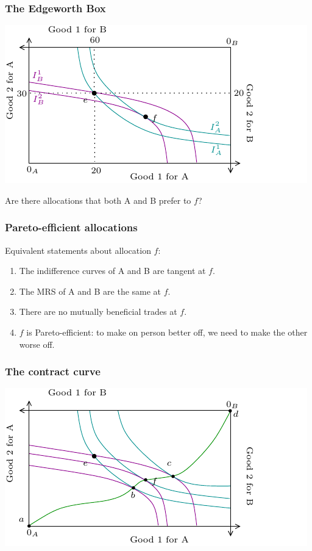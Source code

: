 \documentclass[xcolor=pdftex,dvipsnames]{beamer}
\begin{document}
\begin{frame}
\frametitle{The Edgeworth Box}
\begin{center}
\includegraphics{pics/Edgeworth8}
\end{center}
Are there allocations that both A and B prefer to $f$?
\end{frame}


\begin{frame}
\frametitle{Pareto-efficient allocations}
Equivalent statements about allocation $f$:
\begin{enumerate}[<+->]
  \item The indifference curves of A and B are tangent at $f$.
  \item The MRS of A and B are the same at $f$.
  \item There are no mutually beneficial trades at $f$.
  \item $f$ is Pareto-efficient: to make on person better off, we need
    to make the other worse off.
\end{enumerate}
\bigskip

\end{frame}

\begin{frame}
  \frametitle{The contract curve}
  \begin{center}
    \includegraphics{pics/ContractCurve}
  \end{center}
\end{frame}
\end{document}
